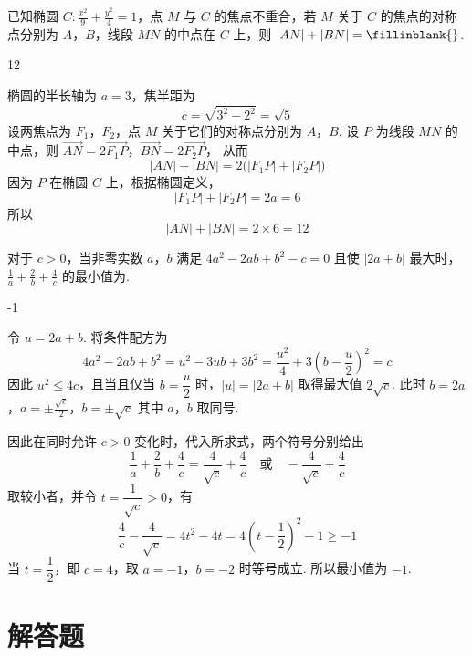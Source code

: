 \begin{problem}
已知椭圆 \(C: \frac{x^2}{9} + \frac{y^2}{4} = 1\)，点 \(M\) 与 \(C\) 的焦点不重合，若 \(M\) 关于 \(C\) 的焦点的对称点分别为 \(A\)，\(B\)，线段 \(MN\) 的中点在 \(C\) 上，则 \(|AN| + |BN| =\fillinblank{}\).
\end{problem}

\begin{answer}
12
\end{answer}

\begin{solution}
椭圆的半长轴为 \(a=3\)，焦半距为
\[
c=\sqrt{3^{2}-2^{2}}=\sqrt5
\]
设两焦点为 \(F_1\)，\(F_2\)，点 \(M\) 关于它们的对称点分别为 \(A\)，\(B\). 设 \(P\) 为线段 \(MN\) 的中点，则
\(\overrightarrow{AN}=2\overrightarrow{F_1P}\)，\(\overrightarrow{BN}=2\overrightarrow{F_2P}\)，
从而
\[
|AN|+|BN|=2\bigl(|F_1P|+|F_2P|\bigr)
\]
因为 \(P\) 在椭圆 \(C\) 上，根据椭圆定义，
\[
|F_1P|+|F_2P|=2a=6
\]
所以
\[
|AN|+|BN|=2\times6=12
\]
\end{solution}

\begin{problem}
对于 \(c > 0\)，当非零实数 \(a\)，\(b\) 满足 \(4a^2 - 2ab + b^2 - c = 0\) 且使 \(|2a + b|\) 最大时，\(\frac{1}{a} + \frac{2}{b} + \frac{4}{c}\) 的最小值为\fillinblank{}.
\end{problem}

\begin{answer}
-1
\end{answer}

\begin{solution}
令 \(u=2a+b\). 将条件配方为
\[
4a^{2}-2ab+b^{2}=u^{2}-3ub+3b^{2}
=\frac{u^{2}}{4}+3\left(b-\frac{u}{2}\right)^{2}=c
\]
因此 \(u^{2}\leqslant4c\)，且当且仅当 \(b=\dfrac{u}{2}\) 时，\(|u|=|2a+b|\) 取得最大值 \(2\sqrt c\). 此时
\(b=2a\)，\(a=\pm\frac{\sqrt c}{2}\)，\(b=\pm\sqrt c\)
其中 \(a\)，\(b\) 取同号.

因此在同时允许 \(c>0\) 变化时，代入所求式，两个符号分别给出
\[
\frac1a+\frac2b+\frac4c=\frac4{\sqrt c}+\frac4c
\quad\text{或}\quad
-\frac4{\sqrt c}+\frac4c
\]
取较小者，并令 \(t=\dfrac1{\sqrt c}>0\)，有
\[
\frac4c-\frac4{\sqrt c}=4t^{2}-4t=4\left(t-\frac12\right)^{2}-1\geqslant-1
\]
当 \(t=\dfrac12\)，即 \(c=4\)，取 \(a=-1\)，\(b=-2\) 时等号成立. 所以最小值为 \(-1\).
\end{solution}

\section{解答题}

